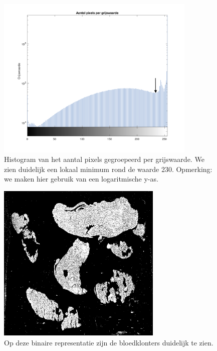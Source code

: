 \documentclass[a4paper,kulak]{kulakarticle}
\begin{document}
\begin{figure}[H]
	\centering
	\includegraphics[width=0.85\textwidth]{GetBestthreshold_vb_aangeduid.png}
	
	\caption{Histogram van het aantal pixels gegroepeerd per grijswaarde. We zien duidelijk een lokaal minimum rond de waarde 230. Opmerking: we maken hier gebruik van een logaritmische y-as.}
	\label{figuur graf1}
\end{figure}

\begin{figure}[H]
	\centering
	\includegraphics[width=0.7\textwidth]{grijswaarden_bin_vb}
	\caption{Op deze binaire representatie zijn de bloedklonters duidelijk te zien.}
	\label{figuur foto_bin}
\end{figure}
\end{document}
